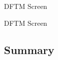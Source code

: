 \documentclass[t]{beamer}
\begin{document}
\begin{frame}{DFTM Screen}
\begin{figure}
\end{figure}
\end{frame}

\begin{frame}{DFTM Screen}
\begin{figure}
\end{figure}
\end{frame}

\subsection{Summary}
\end{document}
